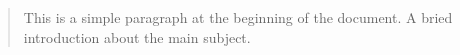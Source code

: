\documentclass{article}
\begin{document}
\begin{abstract}
This is a simple paragraph at the beginning of the document. A bried introduction about the main subject.
\end{abstract}
\end{document}
